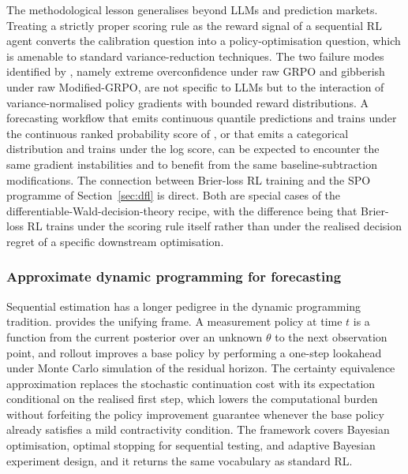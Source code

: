The methodological lesson generalises beyond LLMs and prediction markets. Treating
a strictly proper scoring rule as the reward signal of a sequential RL agent
converts the calibration question into a policy-optimisation question, which is
amenable to standard variance-reduction techniques. The two failure modes
identified by \citet{Turtel2025}, namely extreme overconfidence under raw GRPO and
gibberish under raw Modified-GRPO, are not specific to LLMs but to the interaction
of variance-normalised policy gradients with bounded reward distributions. A
forecasting workflow that emits continuous quantile predictions and trains under
the continuous ranked probability score of \citet{GneitingRaftery2007}, or that
emits a categorical distribution and trains under the log score, can be expected
to encounter the same gradient instabilities and to benefit from the same
baseline-subtraction modifications. The connection between Brier-loss RL training
and the SPO programme of Section~\ref{sec:dfl} is direct. Both are special cases
of the differentiable-Wald-decision-theory recipe, with the difference being that
Brier-loss RL trains under the scoring rule itself rather than under the realised
decision regret of a specific downstream optimisation.

\subsubsection{Approximate dynamic programming for forecasting}
\label{sec:adp_forecasting}

Sequential estimation has a longer pedigree in the dynamic programming tradition.
\citet{BertsekasRollout2022} provides the unifying frame. A measurement policy at
time $t$ is a function from the current posterior over an unknown $\theta$ to the
next observation point, and rollout improves a base policy by performing a one-step
lookahead under Monte Carlo simulation of the residual horizon. The certainty
equivalence approximation replaces the stochastic continuation cost with its
expectation conditional on the realised first step, which lowers the computational
burden without forfeiting the policy improvement guarantee whenever the base policy
already satisfies a mild contractivity condition. The framework covers Bayesian
optimisation, optimal stopping for sequential testing, and adaptive Bayesian
experiment design, and it returns the same vocabulary as standard RL.

